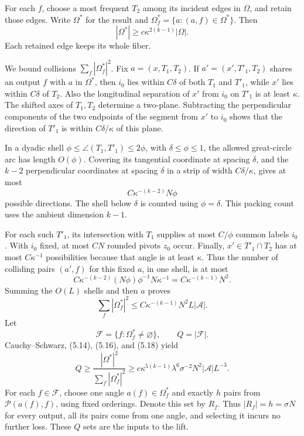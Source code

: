 \documentclass[
  11pt,
  a4paper,
]{article}
\begin{document}
For each \(f\), choose a most frequent \(T_2\) among its incident edges
in \(\Omega\), and retain those edges. Write \(\Omega^*\) for the result
and \(\Omega_f^*=\{a:(a,f)\in\Omega^*\}\). Then \[
 |\Omega^*|\ge c\kappa^{2(k-1)}|\Omega|.           \tag{5.16}\label{eq:5.16}
\] Each retained edge keeps its whole fiber.

We bound collisions \(\sum_f|\Omega_f^*|^2\). Fix \(a=(x,T_1,T_2)\). If
\(a'=(x',T'_1,T_2)\) shares an output \(f\) with \(a\) in \(\Omega^*\),
then \(i_0\) lies within \(C\delta\) of both \(T_1\) and \(T'_1\), while
\(x'\) lies within \(C\delta\) of \(T_2\). Also the longitudinal
separation of \(x'\) from \(i_0\) on \(T'_1\) is at least \(\kappa\).
The shifted axes of \(T_1,T_2\) determine a two-plane. Subtracting the
perpendicular components of the two endpoints of the segment from \(x'\)
to \(i_0\) shows that the direction of \(T'_1\) is within
\(C\delta/\kappa\) of this plane.

In a dyadic shell \(\phi\le\angle(T_1,T'_1)\le2\phi\), with
\(\delta\le\phi\le1\), the allowed great-circle arc has length
\(O(\phi)\). Covering its tangential coordinate at spacing \(\delta\),
and the \(k-2\) perpendicular coordinates at spacing \(\delta\) in a
strip of width \(C\delta/\kappa\), gives at most \[
 C\kappa^{-(k-2)}N\phi                           \tag{5.17}\label{eq:5.17}
\] possible directions. The shell below \(\delta\) is counted using
\(\phi=\delta\). This packing count uses the ambient dimension \(k-1\).

For each such \(T'_1\), its intersection with \(T_1\) supplies at most
\(C/\phi\) common labels \(i_0\). With \(i_0\) fixed, at most \(CN\)
rounded pivots \(z_0\) occur. Finally, \(x'\in T'_1\cap T_2\) has at
most \(C\kappa^{-1}\) possibilities because that angle is at least
\(\kappa\). Thus the number of colliding pairs \((a',f)\) for this fixed
\(a\), in one shell, is at most \[
 C\kappa^{-(k-2)}(N\phi)\phi^{-1}N\kappa^{-1}
 =C\kappa^{-(k-1)}N^2.
\] Summing the \(O(L)\) shells and then \(a\) proves \[
 \sum_f|\Omega_f^*|^2
 \le C\kappa^{-(k-1)}N^2L|\mathcal A|.             \tag{5.18}\label{eq:5.18}
\] Let \[
 \mathcal F=\{f:\Omega_f^*\ne\varnothing\},\qquad Q=|\mathcal F|.
\] Cauchy--Schwarz, (5.14), (5.16), and (5.18) yield \[
 Q\ge\frac{|\Omega^*|^2}{\sum_f|\Omega_f^*|^2}
 \ge c\kappa^{5(k-1)}\lambda^6\sigma^{-2}
                 N^2|\mathcal A|L^{-3}.          \tag{5.19}\label{eq:5.19}
\] For each \(f\in\mathcal F\), choose one angle \(a(f)\in\Omega_f^*\)
and exactly \(h\) pairs from \(\mathcal P(a(f),f)\), using fixed
orderings. Denote this set by \(R_f\). Thus \(|R_f|=h=\sigma N\) for
every output, all its pairs come from one angle, and selecting it incurs
no further loss. These \(Q\) sets are the inputs to the lift.
\end{document}
